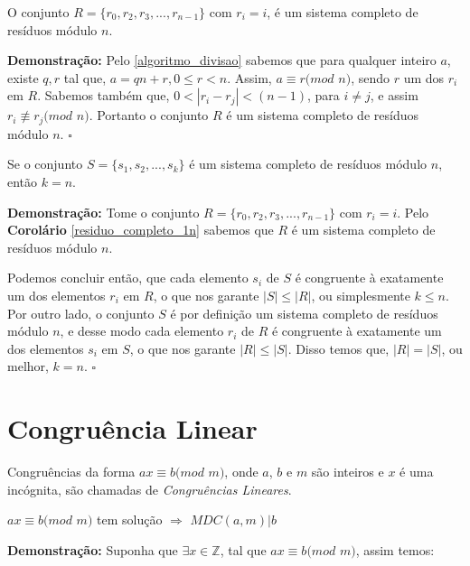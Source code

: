 \begin{corollary}\label{residuo_completo_1n}
O conjunto $R = \{r_0, r_2, r_3,...,r_{n-1}\}$ com $r_i = i$, é um sistema completo de resíduos módulo $n$.
\end{corollary}
\textbf{Demonstração:}
Pelo \autoref{algoritmo_divisao} sabemos que para qualquer inteiro $a$, existe $q, r$ tal que, $a = qn + r, 0 \leq r < n$. Assim, $a\equiv r(mod$ $n)$, sendo $r$ um dos $r_i$ em $R$.
Sabemos também que, $0 < |r_i-r_j| < (n-1)$, para $i\neq j$, e assim $r_i\not\equiv r_j(mod$ $n)$.
Portanto o conjunto $R$ é um sistema completo de resíduos módulo $n$. $\square$
\\

\begin{theorem}
Se o conjunto $S = \{s_1, s_2, ..., s_k\}$ é um sistema completo de resíduos módulo $n$, então $k=n$.
\end{theorem}
\textbf{Demonstração:}
Tome o conjunto $R = \{r_0, r_2, r_3,...,r_{n-1}\}$ com $r_i = i$. Pelo \textbf{Corolário} \autoref{residuo_completo_1n} sabemos que $R$ é um sistema completo de resíduos módulo $n$.

Podemos concluir então, que cada elemento $s_i$ de $S$ é congruente à exatamente um dos elementos $r_i$ em $R$, o que nos garante $|S| \leq |R|$, ou simplesmente $k\leq n$. 
Por outro lado, o conjunto $S$ é por definição um sistema completo de resíduos módulo $n$, e desse modo cada elemento $r_i$ de $R$ é congruente à exatamente um dos elementos $s_i$ em $S$, o que nos garante $|R| \leq |S|$.
Disso temos que, $|R| = |S|$, ou melhor, $k=n$. $\square$
\\




\section{Congruência Linear}

\begin{definition}
Congruências da forma $ax \equiv b (mod$ $m)$, onde $a$, $b$ e $m$ são inteiros e $x$ é uma incógnita, são chamadas de \textit{Congruências Lineares}.
\end{definition}



\begin{corollary}\label{congruencia_linear_ida}
$ax \equiv b (mod$ $m)$ tem solução $\Rightarrow$ $MDC(a,m)|b$
\end{corollary}
\textbf{Demonstração:}
Suponha que $\exists x\in\mathbb{Z}$, tal que $ax\equiv b(mod$ $m)$, assim temos:

